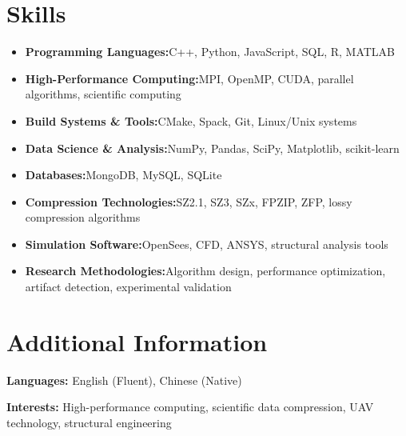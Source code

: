\documentclass[a4paper,11pt]{article}
\newcommand{\resumeItem}[2]{
  \item{
    \textbf{#1}{\hspace{0.5mm}#2 \vspace{-0.5mm}}
  }
}
\newcommand{\resumeSubItem}[2]{\resumeItem{#1}{#2}\vspace{-4pt}}
\newcommand{\resumeHeadingSkillStart}{\begin{itemize}[leftmargin=*,itemsep=1.7mm, rightmargin=2ex]}
\newcommand{\resumeHeadingSkillEnd}{\end{itemize}\vspace{-2mm}}
\begin{document}
\section{\textbf{Skills}}
\vspace{-0.4mm}
 \resumeHeadingSkillStart
  \resumeSubItem{Programming Languages:}
    {C++, Python, JavaScript, SQL, R, MATLAB}
  \resumeSubItem{High-Performance Computing:}
    {MPI, OpenMP, CUDA, parallel algorithms, scientific computing}
  \resumeSubItem{Build Systems \& Tools:}
    {CMake, Spack, Git, Linux/Unix systems}
  \resumeSubItem{Data Science \& Analysis:}
    {NumPy, Pandas, SciPy, Matplotlib, scikit-learn}
\resumeSubItem{Databases:}
    {MongoDB, MySQL, SQLite}
  \resumeSubItem{Compression Technologies:}
    {SZ2.1, SZ3, SZx, FPZIP, ZFP, lossy compression algorithms}
  \resumeSubItem{Simulation Software:}
    {OpenSees, CFD, ANSYS, structural analysis tools}
  \resumeSubItem{Research Methodologies:}
    {Algorithm design, performance optimization, artifact detection, experimental validation}
 \resumeHeadingSkillEnd


\section{\textbf{Additional Information}}
\vspace{-0.4mm}
\small{
\textbf{Languages:} English (Fluent), Chinese (Native)

\textbf{Interests:} High-performance computing, scientific data compression, UAV technology, structural engineering
}
\vspace{-4mm}
\end{document}
